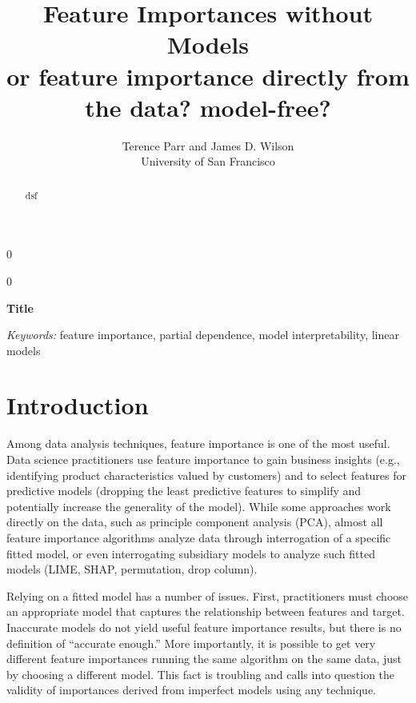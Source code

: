 \documentclass[12pt]{article}
\newcommand{\blind}{0}
\begin{document}
\def\spacingset#1{\renewcommand{\baselinestretch}%
{#1}\small\normalsize} \spacingset{1}



\blind
{
  \title{\bf Feature Importances without Models\\
  {\small or feature importance directly from the data? model-free?}}

  \author{Terence Parr and James D. Wilson\\
      University of San Francisco\\
}
  \maketitle
} \fi

\blind
{
  \bigskip
  \bigskip
  \bigskip
  \begin{center}
    {\LARGE\bf Title}
\end{center}
  \medskip
} \fi

\bigskip
\begin{abstract}
dsf
\end{abstract}

\noindent%
{\it Keywords:} feature importance, partial dependence, model interpretability, linear models

\section{Introduction}
\label{sec:intro}

Among data analysis techniques, feature importance is one of the most  useful. Data science practitioners use feature importance to gain business insights (e.g., identifying product characteristics valued by customers) and to select features for predictive models (dropping the least predictive features to simplify and potentially increase the generality of the model). While some approaches work directly on the data, such as principle component analysis (PCA), almost all feature importance algorithms analyze data through interrogation of a specific  fitted model, or even interrogating subsidiary models to analyze such fitted models (LIME, SHAP, permutation, drop column).

Relying on a fitted model has a number of issues. First, practitioners must choose an appropriate model that captures the relationship between features and target. Inaccurate models do not yield useful feature importance results, but there is no definition of ``accurate enough.'' More importantly, it is possible to get very different feature importances running the same algorithm on the same data, just by choosing a different model. This fact is troubling and calls into question the validity of importances derived from imperfect models using any technique.  
\end{document}
